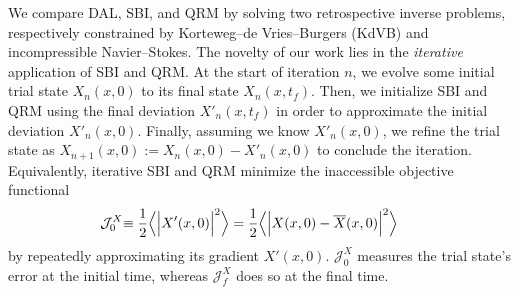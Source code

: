 \documentclass[%
 reprint,
 amsmath,amssymb,
 aps,
 pre,
]{revtex4-2}
\newcommand{\J}{\mathcal{J}}
\begin{document}
We compare DAL, SBI, and QRM by solving two retrospective inverse problems, respectively constrained by Korteweg--de Vries--Burgers (KdVB) and incompressible Navier--Stokes.
The novelty of our work lies in the \textit{iterative} application of SBI and QRM.
At the start of iteration $n$, we evolve some initial trial state $X_n(x,0)$ to its final state $X_n(x,t_f)$. 
Then, we initialize SBI and QRM using the final deviation $X'_n(x,t_f)$ in order to approximate the initial deviation $X'_n(x, 0)$.
Finally, assuming we know $X'_n(x, 0)$, we refine the trial state as $X_{n+1}(x, 0) := X_{n}(x, 0) - X'_n(x, 0)$ to conclude the iteration.
Equivalently, iterative SBI and QRM minimize the inaccessible objective functional 
\begin{align}
    \hspace{-0.2cm}\J_0^X \hspace{-0.1cm} &\equiv \frac{1}{2} \Big\langle\Big| X'(x, 0) \Big|^2\Big\rangle = \frac{1}{2} \Big\langle\Big| X(x, 0) - \overline{X}(x, 0) \Big|^2\Big\rangle \label{costoutro}
\end{align}
by repeatedly approximating its gradient $X'(x, 0)$.
$\J_0^X$ measures the trial state's error at the initial time, whereas $\J_f^X$ does so at the final time.
\end{document}
